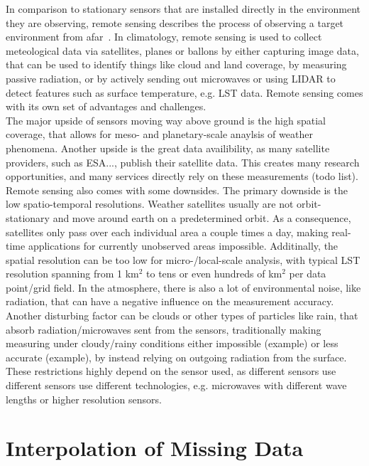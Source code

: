 In comparison to stationary sensors that are installed directly in the environment they are observing, remote sensing describes the process of observing a target environment from afar~\cite{campbell2011introduction}. In climatology, remote sensing is used to collect meteological data via satellites, planes or ballons by either capturing image data, that can be used to identify things like cloud and land coverage, by measuring passive radiation, or by actively sending out microwaves or using LIDAR to detect features such as surface temperature, e.g. LST data. Remote sensing comes with its own set of advantages and challenges.\\
The major upside of sensors moving way above ground is the high spatial coverage, that allows for meso- and planetary-scale anaylsis of weather phenomena. Another upside is the great data availibility, as many satellite providers, such as ESA..., publish their satellite data. This creates many research opportunities, and many services directly rely on these measurements (todo list).\\ %
Remote sensing also comes with some downsides. The primary downside is the low spatio-temporal resolutions. Weather satellites usually are not orbit-stationary and move around earth on a predetermined orbit. As a consequence, satellites only pass over each individual area a couple times a day, making real-time applications for currently unobserved areas impossible. Additinally, the spatial resolution can be too low for micro-/local-scale analysis, with typical LST resolution spanning from 1 km$^{2}$ to tens or even hundreds of km$^{2}$ per data point/grid field. In the atmosphere, there is also a lot of environmental noise, like radiation, that can have a negative influence on the measurement accuracy. Another disturbing factor can be clouds or other types of particles like rain, that absorb radiation/microwaves sent from the sensors, traditionally making measuring under cloudy/rainy conditions either impossible (example) or less accurate (example), by instead relying on outgoing radiation from the surface. These restrictions highly depend on the sensor used, as different sensors use different 
sensors use different technologies, e.g. microwaves with different wave lengths or higher resolution sensors.


\section{Interpolation of Missing Data}

